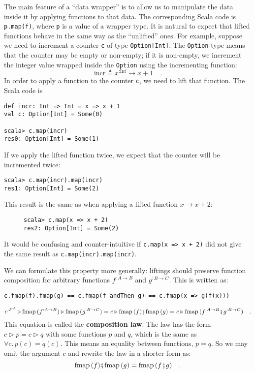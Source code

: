 The main feature of a \textsf{``}data wrapper\textsf{''} is to allow us to manipulate
the data inside it by applying functions to that data. The corresponding
Scala code is \lstinline!p.map(f)!, where \lstinline!p! is a value
of a wrapper type. It is natural to expect that lifted functions behave
in the same way as the \textsf{``}unlifted\textsf{''} ones. For example, suppose we
need to increment a counter \lstinline!c! of type \lstinline!Option[Int]!.
The \lstinline!Option! type means that the counter may be empty or
non-empty; if it is non-empty, we increment the integer value wrapped
inside the \lstinline!Option! using the incrementing function:
\[
\text{incr}\triangleq x^{:\text{Int}}\rightarrow x+1\quad.
\]
In order to apply a function to the counter \lstinline!c!, we need
to lift that function. The Scala code is
\begin{lstlisting}
def incr: Int => Int = x => x + 1
val c: Option[Int] = Some(0)

scala> c.map(incr)
res0: Option[Int] = Some(1) 
\end{lstlisting}
If we apply the lifted function twice, we expect that the counter
will be incremented twice:
\begin{lstlisting}
scala> c.map(incr).map(incr)
res1: Option[Int] = Some(2)
\end{lstlisting}
This result is the same as when applying a lifted function $x\rightarrow x+2$:

\begin{wrapfigure}{l}{0.3\columnwidth}%
\vspace{-0.8\baselineskip}
\begin{lstlisting}
scala> c.map(x => x + 2)
res2: Option[Int] = Some(2)
\end{lstlisting}
\vspace{-1.2\baselineskip}
\end{wrapfigure}%

\noindent It would be confusing and counter-intuitive if \lstinline!c.map(x => x + 2)!
did not give the same result as \lstinline!c.map(incr).map(incr)!. 

We can formulate this property more generally: liftings should preserve
function composition for arbitrary functions $f^{:A\rightarrow B}$
and $g^{:B\rightarrow C}$. This is written as:
\begin{lstlisting}
c.fmap(f).fmap(g) == c.fmap(f andThen g) == c.fmap(x => g(f(x))) 
\end{lstlisting}
\[
c^{:F^{A}}\triangleright\text{fmap}\,(f^{:A\rightarrow B})\triangleright\text{fmap}\,(g^{:B\rightarrow C})=c\triangleright\text{fmap}\,(f)\bef\text{fmap}\,(g)=c\triangleright\text{fmap}\,(f^{:A\rightarrow B}\bef g^{:B\rightarrow C})\quad.
\]
This equation is called the \textbf{composition law}.
The law has the form $c\triangleright p=c\triangleright q$ with some
functions $p$ and $q$, which is the same as $\forall c.\,p(c)=q(c)$.
This means an equality between functions, $p=q$. So we may omit the
argument $c$ and rewrite the law in a shorter form as:
\[
\text{fmap}\,(f)\bef\text{fmap}\,(g)=\text{fmap}\,(f\bef g)\quad.
\]

